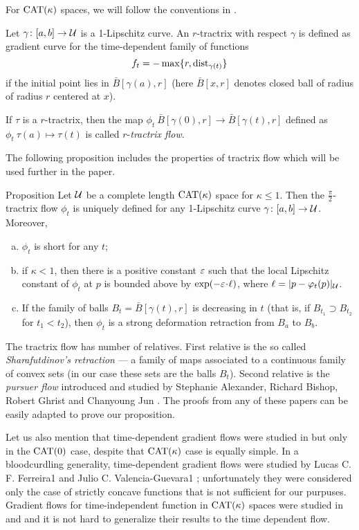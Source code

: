 \documentclass[oneside,a4paper, 12pt]{article}
\begin{document}
For $\mathrm{CAT}(\kappa)$ spaces, we will follow the conventions in \cite{akp}.

Let $\gamma\colon[a,b]\to \mathcal{U}$ is a 1-Lipschitz curve. 
An $r$-tractrix with respect $\gamma$ is defined as gradient curve for the time-dependent family of functions 
\[f_t=- \max\{r,\mathop{\rm dist}\nolimits_{\gamma(t)}\}\]
if the initial point lies in $\bar B[\gamma(a),r]$
(here $\bar B[x,r]$ denotes closed ball of radius of radius $r$ centered at $x$).

If $\tau$ is a $r$-tractrix, then the map $\phi_t\:\bar B[\gamma(0),r]\to\bar B[\gamma(t),r] $ defined as $\phi_t\:\tau(a)\mapsto \tau(t)$ is called $r$-\emph{tractrix flow}.

The following proposition includes the properties of tractrix flow which will be used further in the paper.

\begin{thm}{Proposition}\label{prop-def}
Let $\mathcal{U}$ be a complete length $\mathrm{CAT}(\kappa)$ space for $\kappa\le 1$.
Then the $\tfrac\pi2$-tractrix flow $\phi_t$ is uniquely defined for any 1-Lipschitz curve $\gamma\colon[a,b]\to \mathcal{U}$.
Moreover,
\begin{enumerate}[(a)]
 \item $\phi_t$ is short for any $t$;
 \item if $\kappa<1$, then there is a positive constant $\varepsilon$ such that the local Lipschitz constant of $\phi_t$ at $p$ is bounded above by $\exp(-\eps\cdot\ell)$, where $\ell=|p-\varphi_t(p)|_{\mathcal{U}}$.
 \item\label{sharafutdinov} If the family of balls $B_t=\bar B[\gamma(t),r]$ is decreasing in $t$ (that is, if $B_{t_1}\supset B_{t_2}$ for $t_1<t_2$), then $\phi_t$ is a strong deformation retraction from $B_a$ to $B_b$.
\end{enumerate}
\end{thm}

The tractrix flow has number of relatives.
First relative is the so called \emph{Sharafutdinov's retraction} \cite{sharafutdinov} --- a family of maps associated to a continuous family of convex sets (in our case these sets are the balls $B_t$). 
Second relative is the \emph{pursuer flow} introduced and studied by Stephanie Alexander, Richard Bishop, Robert Ghrist and Chanyoung Jun \cite{ABG,jun-thesis,jun,jun:grad}.
The proofs from any of these papers can be easily adapted to prove our proposition.

Let us also mention that time-dependent gradient flows were studied in \cite{jun-thesis,jun:grad} but only in the $\mathrm{CAT}(0)$ case, despite that $\mathrm{CAT}(\kappa)$ case is equally simple.
In a bloodcurdling generality, time-dependent gradient flows were studied by Lucas C. F. Ferreira1 and Julio C. Valencia-Guevara1 \cite{ferreira-valencia}; unfortunately they were considered only the case of strictly concave functions that is not sufficient for our purpuses.
Gradient flows for time-independent function in $\mathrm{CAT}(\kappa)$ spaces were studied in \cite{lytchak-open-map} and \cite{ohta-palfia} and it is not hard to generalize their results to the time dependent flow.
\end{document}
